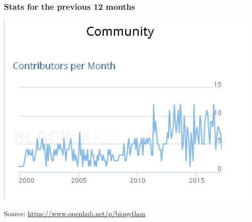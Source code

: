 \documentclass[trans]{beamer}
\begin{document}
{
  \frametitle{Stats for the previous 12 months}

  \begin{center}
  \includegraphics[width=1.0\textwidth]{figures/openhub-bp-community-activity.png}
  \end{center}
  \small{Source: \url{https://www.openhub.net/p/biopython}}
}
\frame
\end{document}
